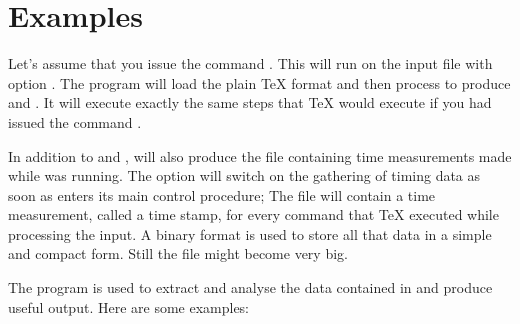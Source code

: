 \documentclass[a4paper,english]{article}
\begin{document}
\section{Examples}
Let's assume that you issue the command  
.  This will run  on the input file
 with option .  The program 
will load the plain TeX format and then process  to
produce  and .  It will execute
exactly the same steps that TeX would execute if you had issued the
command  .

In addition to  and , 
will also produce the file  containing time
measurements made while  was running.  The option
 will switch on the gathering of timing data as soon as
 enters its main control procedure; The file
 will contain a time measurement, called a time
stamp, for every command that TeX executed while processing the input.
A binary format is used to store all that data in a simple and compact
form. Still the file  might become very big.

The program  is used to extract and analyse the data
contained in  and produce useful output.  Here are
some examples:
  
\end{document}
